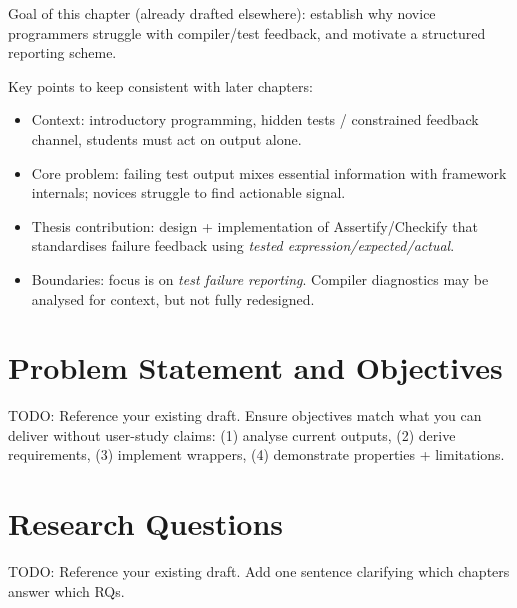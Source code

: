 \documentclass[
	bibliography=totoc,
	listof=totoc,
]{scrbook}
\begin{document}
\begin{justify}
Goal of this chapter (already drafted elsewhere): establish why novice programmers struggle with compiler/test feedback, and motivate a structured reporting scheme.

Key points to keep consistent with later chapters:
\begin{itemize}
    \item Context: introductory programming, hidden tests / constrained feedback channel, students must act on output alone.
    \item Core problem: failing test output mixes essential information with framework internals; novices struggle to find actionable signal.
    \item Thesis contribution: design + implementation of Assertify/Checkify that standardises failure feedback using \emph{tested expression/expected/actual}.
    \item Boundaries: focus is on \emph{test failure reporting}. Compiler diagnostics may be analysed for context, but not fully redesigned.
\end{itemize}
\end{justify}


\section{Problem Statement and Objectives} %

\begin{marker}\begin{justify}
TODO: Reference your existing draft. Ensure objectives match what you can deliver without user-study claims:
(1) analyse current outputs, (2) derive requirements, (3) implement wrappers, (4) demonstrate properties + limitations.
\end{justify}\end{marker}


\section{Research Questions} %

\begin{marker}\begin{justify}
TODO: Reference your existing draft. Add one sentence clarifying which chapters answer which RQs.
\end{justify}\end{marker}
\end{document}
